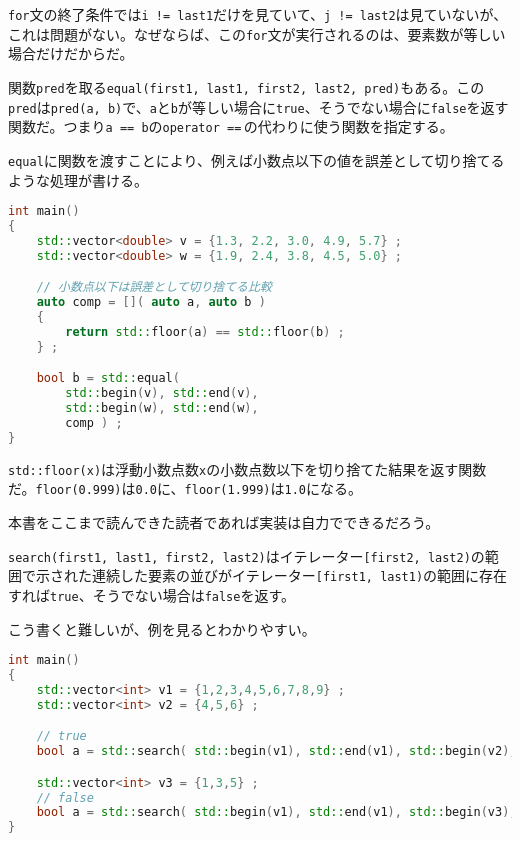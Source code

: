 \texttt{for}文の終了条件では\texttt{i != last1}だけを見ていて、\texttt{j != last2}は見ていないが、これは問題がない。なぜならば、この\texttt{for}文が実行されるのは、要素数が等しい場合だけだからだ。

関数\texttt{pred}を取る\texttt{equal(first1, last1, first2, last2, pred)}もある。この\texttt{pred}は\texttt{pred(a, b)}で、\texttt{a}と\texttt{b}が等しい場合に\texttt{true}、そうでない場合に\texttt{false}を返す関数だ。つまり\texttt{a == b}の\texttt{operator ==}\,の代わりに使う関数を指定する。

\texttt{equal}に関数を渡すことにより、例えば小数点以下の値を誤差として切り捨てるような処理が書ける。

\begin{lstlisting}[language={C++}]
int main()
{
    std::vector<double> v = {1.3, 2.2, 3.0, 4.9, 5.7} ;
    std::vector<double> w = {1.9, 2.4, 3.8, 4.5, 5.0} ;

    // 小数点以下は誤差として切り捨てる比較
    auto comp = []( auto a, auto b )
    {
        return std::floor(a) == std::floor(b) ;
    } ;

    bool b = std::equal(
        std::begin(v), std::end(v),
        std::begin(w), std::end(w),
        comp ) ;
}
\end{lstlisting}

\texttt{std::floor(x)}は浮動小数点数\texttt{x}の小数点数以下を切り捨てた結果を返す関数だ。\texttt{floor(0.999)}は\texttt{0.0}に、\texttt{floor(1.999)}は\texttt{1.0}になる。

本書をここまで読んできた読者であれば実装は自力でできるだろう。


\texttt{search(first1, last1, first2, last2)}はイテレーター\texttt{[first2, last2)}の範囲で示された連続した要素の並びがイテレーター\texttt{[first1, last1)}の範囲に存在すれば\texttt{true}、そうでない場合は\texttt{false}を返す。

こう書くと難しいが、例を見るとわかりやすい。

\ifTombow\pagebreak\fi
\begin{lstlisting}[language={C++}]
int main()
{
    std::vector<int> v1 = {1,2,3,4,5,6,7,8,9} ;
    std::vector<int> v2 = {4,5,6} ;

    // true
    bool a = std::search( std::begin(v1), std::end(v1), std::begin(v2), std::end(v2) ) ;

    std::vector<int> v3 = {1,3,5} ;
    // false 
    bool a = std::search( std::begin(v1), std::end(v1), std::begin(v3), std::end(v3) ) ;
}
\end{lstlisting}

